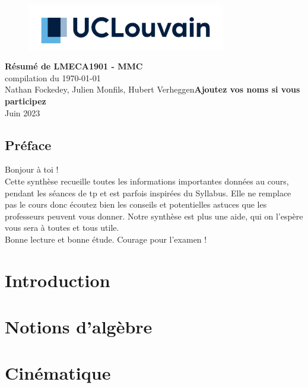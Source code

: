 \documentclass{report}
\begin{document}
\begin{titlepage}
    \begin{figure}
        \includegraphics[height = 2cm]{Images/UCL_Logo.png}
        \label{fig:my_label}
    \end{figure}

    \hspace*{100cm}
    \centering
    \vspace*{7cm}

    {\Huge \textbf{Résumé de LMECA1901 - MMC}}\\
    \vspace*{0.25cm}
    compilation du \today\\
    \vspace*{0.25cm}
    \Large{Nathan Fockedey, Julien Monfils, Hubert Verheggen\textbf{Ajoutez vos noms si vous participez}}\\

    \vspace*{9cm}
    {\Large Juin 2023}
\end{titlepage}


\tableofcontents
\newpage

\section*{Préface}

Bonjour à toi !\\

Cette synthèse recueille toutes les informations importantes données au cours, pendant les séances de tp et est parfois inspirées du Syllabus. Elle ne remplace pas le cours donc écoutez bien les conseils et potentielles astuces que les professeurs peuvent vous donner. Notre synthèse est plus une aide, qui on l'espère vous sera à toutes et tous utile.\\


Bonne lecture et bonne étude. Courage pour l'examen !


\chapter{Introduction}


\chapter{Notions d'algèbre}


\chapter{Cinématique}

\end{document}
